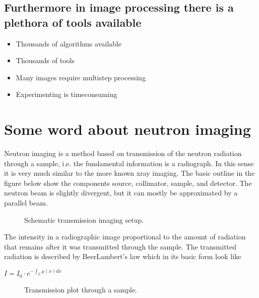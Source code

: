 \documentclass[letterpaper,10pt,english]{sphinxmanual}
\begin{document}
\subsection{Furthermore in image processing there is a plethora of tools available}
\label{\detokenize{ML4NeutronImageSegmentation:furthermore-in-image-processing-there-is-a-plethora-of-tools-available}}\begin{itemize}
\item {} 
Thousands of algorithms available

\item {} 
Thousands of tools

\item {} 
Many images require multi\sphinxhyphen{}step processing

\item {} 
Experimenting is time\sphinxhyphen{}consuming

\end{itemize}


\section{Some word about neutron imaging}
\label{\detokenize{ML4NeutronImageSegmentation:some-word-about-neutron-imaging}}


Neutron imaging is a method based on transmission of the neutron radiation through a sample, i.e. the fundamental information is a radiograph. In this sense it is very much similar to the more known x\sphinxhyphen{}ray imaging. The basic outline in the figure below show the components source, collimator, sample, and detector. The neutron beam is slightly divergent, but it can mostly be approximated by a parallel beam.

\begin{figure}[htbp]
\centering
\capstart

\noindent{}
\caption{Schematic transmission imaging setup.}\label{\detokenize{ML4NeutronImageSegmentation:id1}}\end{figure}

The intensity in a radiographic image proportional to the amount of radiation that remains after it was transmitted through the sample. The transmitted radiation is described by Beer\sphinxhyphen{}Lambert’s law which in its basic form look like

\(I=I_0\cdot{}e^{-\int_L \mu{}(x) dx}\)

\begin{figure}[htbp]
\centering
\capstart

\noindent{}
\caption{Transmission plot through a sample.}\label{\detokenize{ML4NeutronImageSegmentation:id2}}\end{figure}
\end{document}
